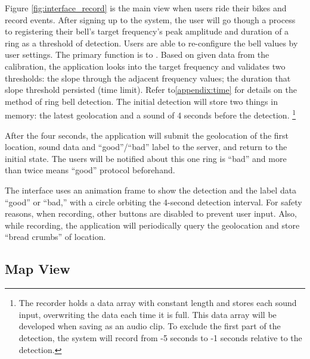 Figure \ref{fig:interface_record} is the main view when users ride their bikes and record events. After signing up to the system, the user will go though a process to registering their bell's target frequency's peak amplitude and duration of a ring as a threshold of detection. Users are able to re-configure the bell values by user settings. The primary function is to . Based on  given  data  from  the  calibration, the application looks into the target frequency and validates two thresholds: the slope through the adjacent frequency values; the duration that slope threshold persisted (time limit). Refer to\ref{appendix:time} for details on the method of ring bell detection. The initial detection will store two things in memory: the latest geolocation and a sound of 4 seconds before the detection.
\footnote{The recorder holds a data array with constant length and stores each sound input, overwriting the data each time
it is full. This data array will be developed when saving as an audio clip. To exclude the first part of the detection, the system will record from
-5 seconds to -1 seconds relative to the detection.}

After the four seconds, the application will submit the geolocation of the first location, sound data and ``good''/``bad'' label to the server, and return to the initial state. The users will be notified about this one ring is ``bad'' and more than twice means ``good'' protocol beforehand.

The interface uses an animation frame to show the detection and the label data “good” or “bad,” with a circle orbiting the 4-second detection interval. For safety reasons, when recording, other buttons are disabled to prevent user input. Also, while recording, the application will periodically query the geolocation and store “bread crumbs” of location.

\subsection{Map View}

